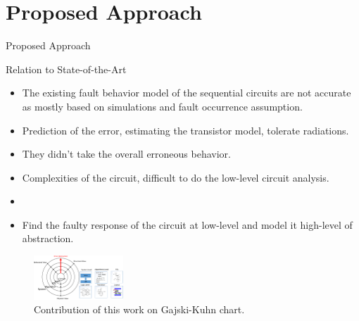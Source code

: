 \documentclass[aspectratio=1610]{beamer}
\begin{document}
\section{Proposed Approach}
\begin{frame}{Proposed Approach}



\begin{block}{Relation to State-of-the-Art}
\end{block}
\begin{itemize}
\item The existing fault behavior model of the sequential circuits are not accurate as mostly based on simulations and fault occurrence assumption.

\item Prediction of the error, estimating the transistor model,  tolerate radiations.

\item They didn't take the overall erroneous behavior.
\item Complexities of the circuit, difficult to do the low-level circuit analysis. 
\item \textbf{\cite{robache2013methodology} \cite{hobeika2014multi}}
\item Find the faulty response of the circuit at low-level and model it high-level of abstraction.


\end{itemize}

\begin{figure}[tb!]
 \centering
  \captionsetup{justification=centering}    
   \includegraphics[width=0.3\textwidth]{Figures/ychart-block.pdf}
   \caption{Contribution of this work on Gajski-Kuhn chart.}
\label{fig:ychart}
\end{figure}


\end{frame}
\end{document}
